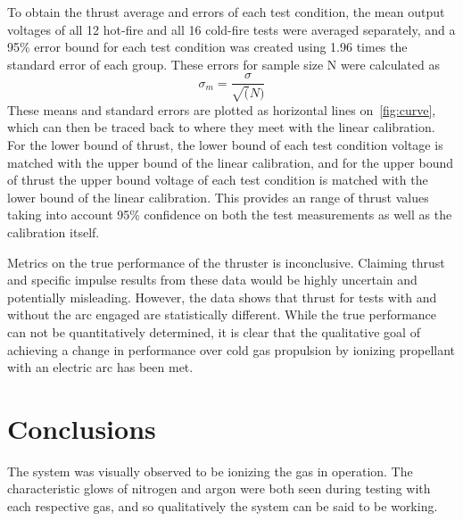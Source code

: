 \documentclass[journal]{IEEEtran}
\begin{document}
To obtain the thrust average and errors of each test condition, the mean output voltages of all 12 hot-fire and all 16 cold-fire tests were averaged separately, and a 95\% error bound for each test condition was created using 1.96 times the standard error of each group. These errors for sample size N were calculated as
\begin{equation}
\label{eq:stderr}
  \sigma_m = \frac{\sigma}{\sqrt(N)}
\end{equation}
These means and standard errors are plotted as horizontal lines on~\autoref{fig:curve}, which can then be traced back to where they meet with the linear calibration. For the lower bound of thrust, the lower bound of each test condition voltage is matched with the upper bound of the linear calibration, and for the upper bound of thrust the upper bound voltage of each test condition is matched with the lower bound of the linear calibration.
This provides an range of thrust values taking into account 95\% confidence on both the test measurements as well as the calibration itself.

Metrics on the true performance of the thruster is inconclusive.
Claiming thrust and specific impulse results from these data would be highly uncertain and potentially misleading.
However, the data shows that thrust for tests with and without the arc engaged are statistically different.
While the true performance can not be quantitatively determined, it is clear that the qualitative goal of achieving a change in performance over cold gas propulsion by ionizing propellant with an electric arc has been met.





\section{Conclusions}
The system was visually observed to be ionizing the gas in operation. The characteristic glows of nitrogen and argon were both seen during testing with each respective gas, and so qualitatively the system can be said to be working.
\end{document}
